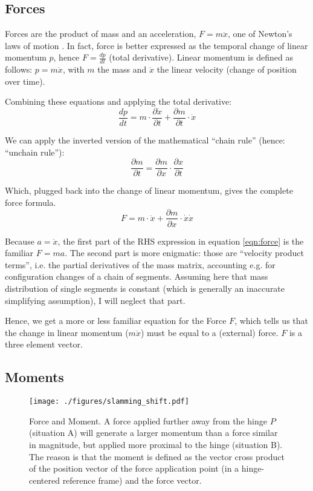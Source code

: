 \documentclass[10pt,a4paper]{article}
\begin{document}
\subsection{Forces}
\label{sec:org6fad421}
Forces are the product of mass and an acceleration, \(F=m\ddot x\), one of Newton's laws of motion \citep{Newton1687,Tipler2007}.
In fact, force is better expressed as the temporal change of linear momentum \(p\), hence \(F=\frac{d p}{d t}\) (total derivative).
Linear momentum is defined as follows: \(p=m\dot x\), with \(m\) the mass and \(\dot x\) the linear velocity (change of position over time).

Combining these equations and applying the total derivative:
\[\frac{dp}{dt} = m \cdot \frac{\partial \dot x}{\partial t} + \frac{\partial m}{\partial t} \cdot \dot x\]

We can apply the inverted version of the mathematical ``chain rule'' (hence: ``unchain rule''):
\[\frac{\partial m}{\partial t} = \frac{\partial m}{\partial x} \cdot \frac{\partial x}{\partial t} \]

Which, plugged back into the change of linear momentum, gives the complete force formula.
\begin{equation}\label{eqn:force}
F = m \cdot \ddot x + \frac{\partial m}{\partial x} \cdot \dot x \dot x
\end{equation}


Because \(a=\ddot x\), the first part of the RHS expression in equation \eqref{eqn:force} is the familiar \(F=ma\).
The second part is more enigmatic: those are ``velocity product terms'', i.e. the partial derivatives of the mass matrix, accounting e.g. for configuration changes of a chain of segments.
Assuming here that mass distribution of single segments is constant (which is generally an inaccurate simplifying assumption), I will neglect that part.

Hence, we get a more or less familiar equation for the Force \(F\), which tells us that the change in linear momentum (\(m\ddot x\)) must be equal to a (external) force.
\(F\) is a three element vector.


\subsection{Moments}
\label{sec:org1c72b58}

\begin{figure}[htbp]
\centering
\texttt{[image: ./figures/slamming\_shift.pdf]}
\caption{\label{fig:slamming_moment}Force and Moment. A force applied further away from the hinge \(P\) (situation A) will generate a larger momentum than a force similar in magnitude, but applied more proximal to the hinge (situation B). The reason is that the moment is defined as the vector cross product of the position vector of the force application point (in a hinge-centered reference frame) and the force vector.}
\end{figure}
\end{document}
